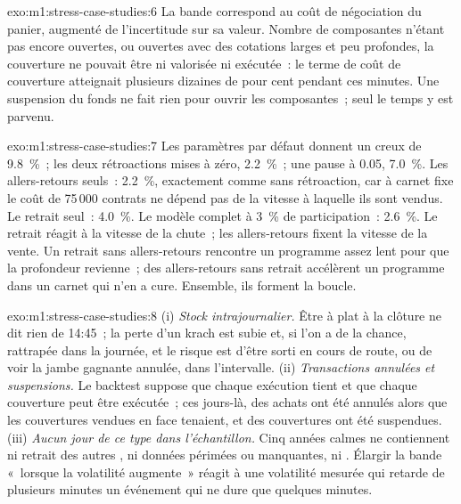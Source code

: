 \begin{solution}{exo:m1:stress-case-studies:6}
La bande correspond au coût de négociation du panier, augmenté de l'incertitude sur
sa valeur. Nombre de composantes n'étant pas encore ouvertes, ou ouvertes avec des cotations larges et peu profondes, la
couverture ne pouvait être ni valorisée ni exécutée~: le terme de coût de couverture atteignait plusieurs dizaines de pour cent
pendant ces minutes. Une suspension du fonds ne fait rien pour ouvrir les
composantes~; seul le temps y est parvenu.
\end{solution}

\begin{solution}{exo:m1:stress-case-studies:7}
Les paramètres par défaut donnent un creux de 9.8~\%~; les deux rétroactions mises à
zéro, 2.2~\%~; une pause à 0.05, 7.0~\%.
Les allers-retours seuls~: 2.2~\%, exactement comme sans rétroaction, car à carnet
fixe le coût de 75\,000 contrats ne dépend pas de la vitesse à laquelle ils sont vendus.
Le retrait seul~: 4.0~\%. Le modèle complet à 3~\% de participation~: 2.6~\%.
Le retrait réagit à la vitesse de la chute~; les allers-retours fixent la vitesse de la
vente. Un retrait sans allers-retours rencontre un programme assez lent pour que la
profondeur revienne~; des allers-retours sans retrait accélèrent un programme dans un carnet
qui n'en a cure. Ensemble, ils forment la boucle.
\end{solution}

\begin{solution}{exo:m1:stress-case-studies:8}
(i) \emph{Stock intrajournalier.} Être à plat à la clôture ne dit rien de 14:45~; la
perte d'un krach est subie et, si l'on a de la chance, rattrapée dans la journée, et
le risque est d'être sorti en cours de route, ou de voir la jambe gagnante annulée, dans l'intervalle.
(ii) \emph{Transactions annulées et suspensions.} Le backtest suppose que chaque exécution tient et que chaque couverture peut être exécutée~; ces
jours-là, des achats ont été annulés alors que les couvertures vendues en face tenaient, et des couvertures ont été suspendues. (iii) \emph{Aucun jour
de ce type dans l'échantillon.} Cinq années calmes ne contiennent ni retrait des autres
, ni données périmées ou manquantes, ni .
Élargir la bande «~lorsque la volatilité augmente~» réagit à une volatilité mesurée qui
retarde de plusieurs minutes un événement qui ne dure que
quelques minutes.
\end{solution}

